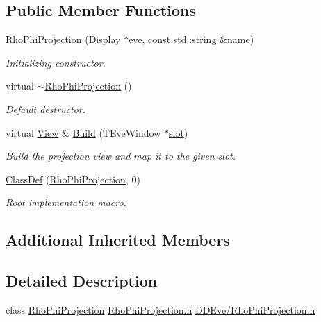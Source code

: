 \subsection*{Public Member Functions}
\begin{DoxyCompactItemize}
\item 
\hyperlink{class_d_d4hep_1_1_rho_phi_projection_abe10facbc4c46e43a3854efada4c99ad}{Rho\+Phi\+Projection} (\hyperlink{class_d_d4hep_1_1_display}{Display} $\ast$eve, const std\+::string \&\hyperlink{class_d_d4hep_1_1_view_ae369eadf16399a6bf34f1ce491b7a788}{name})
\begin{DoxyCompactList}\small\item\em Initializing constructor. \end{DoxyCompactList}\item 
virtual \hyperlink{class_d_d4hep_1_1_rho_phi_projection_a9dc8283aa69ce065236b29de09905b54}{$\sim$\+Rho\+Phi\+Projection} ()
\begin{DoxyCompactList}\small\item\em Default destructor. \end{DoxyCompactList}\item 
virtual \hyperlink{class_d_d4hep_1_1_view}{View} \& \hyperlink{class_d_d4hep_1_1_rho_phi_projection_a6a8d8e5c6a15d559da719c23eb8d7b8c}{Build} (T\+Eve\+Window $\ast$\hyperlink{_multi_view_8cpp_a402e7b855ac7bcf09e2ecf5e98220a11}{slot})
\begin{DoxyCompactList}\small\item\em Build the projection view and map it to the given slot. \end{DoxyCompactList}\item 
\hyperlink{class_d_d4hep_1_1_rho_phi_projection_a33fb99400480c317f4e4d9fabf48836c}{Class\+Def} (\hyperlink{class_d_d4hep_1_1_rho_phi_projection}{Rho\+Phi\+Projection}, 0)
\begin{DoxyCompactList}\small\item\em Root implementation macro. \end{DoxyCompactList}\end{DoxyCompactItemize}
\subsection*{Additional Inherited Members}


\subsection{Detailed Description}
class \hyperlink{class_d_d4hep_1_1_rho_phi_projection}{Rho\+Phi\+Projection} \hyperlink{_rho_phi_projection_8h}{Rho\+Phi\+Projection.\+h} \hyperlink{_rho_phi_projection_8h}{D\+D\+Eve/\+Rho\+Phi\+Projection.\+h} 


